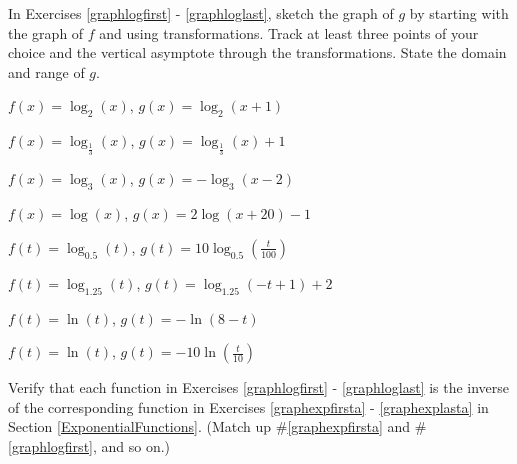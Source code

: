 \documentclass{ximera}
\begin{document}
\begin{question}
In Exercises \ref{graphlogfirst} - \ref{graphloglast}, sketch the graph of $g$ by starting with the graph of $f$ and using transformations.  Track at least three points of your choice and the vertical asymptote through the transformations. State the domain and range of $g$.

\begin{problem}\label{graphlogfirst}
$f(x) = \log_{2}(x)$, $g(x) = \log_{2}(x+1)$ 
\end{problem}

\begin{problem}
$f(x) = \log_{\frac{1}{3}}(x)$, $g(x) = \log_{\frac{1}{3}}(x)+1$
\end{problem}

\begin{problem}
$f(x) = \log_{3}(x)$, $g(x) = -\log_{3}(x-2)$
\end{problem}

\begin{problem}
$f(x) = \log(x)$, $g(x) = 2\log(x+20) -1$ 
\end{problem}

\begin{problem}
$f(t) = \log_{0.5}(t)$, $g(t) = 10 \log_{0.5}\left(\frac{t}{100}\right)$
\end{problem}

\begin{problem}
$f(t) = \log_{1.25}(t)$, $g(t) = \log_{1.25}(-t+1) + 2$
\end{problem}

\begin{problem}
$f(t) = \ln(t)$, $g(t) = -\ln(8-t)$
\end{problem}

\begin{problem}\label{graphloglast}
$f(t) = \ln(t)$, $g(t) = -10\ln\left(\frac{t}{10}\right)$ 
\end{problem}

\end{question}

\begin{problem}
Verify that each function in Exercises \ref{graphlogfirst} - \ref{graphloglast} is the inverse of the corresponding function in Exercises \ref{graphexpfirsta} - \ref{graphexplasta} in Section \ref{ExponentialFunctions}.  (Match up \#\ref{graphexpfirsta} and \#\ref{graphlogfirst}, and so on.)    
\end{problem}
  
\end{document}
